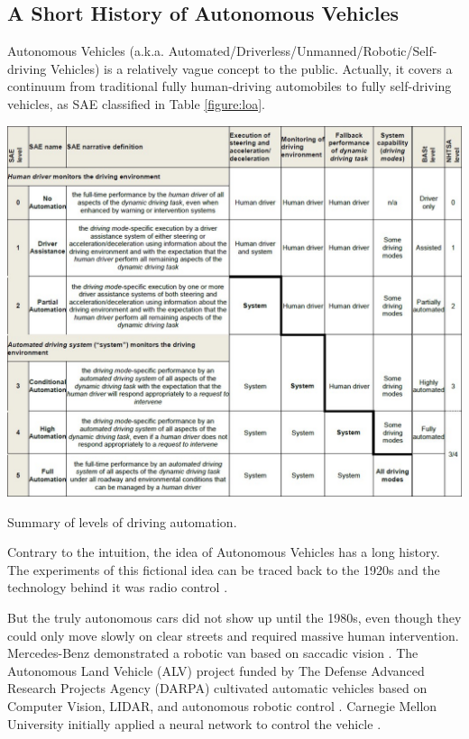 \documentclass[a4paper,12pt]{article}
\begin{document}
\subsection{A Short History of Autonomous Vehicles}
\label{avh}

Autonomous Vehicles (a.k.a. Automated/Driverless/Unmanned/Robotic/Self-driving Vehicles) is a relatively vague concept to the public. Actually, it covers a continuum  from traditional fully human-driving automobiles to fully self-driving vehicles, as SAE classified in Table \ref{figure:loa}.

\begin{table}[h]		
	\includegraphics[width=1\textwidth]{Levels_of_Automation_2014.jpg}
	\caption{Summary of levels of driving automation\cite{J3016_201401}.}
	\centering
	\label{figure:loa}
\end{table}

Contrary to the intuition, the idea of Autonomous Vehicles has a long history. The experiments of this fictional idea can be traced back to the 1920s and the technology behind it was radio control \cite{pawtc}. 

But the truly autonomous cars did not show up until the 1980s, even though they could only move slowly on clear streets and required massive human intervention. Mercedes-Benz demonstrated a robotic van based on saccadic vision \cite{schj}. The Autonomous Land Vehicle (ALV) project funded by The Defense Advanced Research Projects Agency (DARPA) cultivated automatic vehicles based on Computer Vision, LIDAR, and autonomous robotic control \cite{Kanade:1986:ALV:324634.325197}. Carnegie Mellon University initially applied a neural network to control the vehicle \cite{NIPS1988_95}. 
\end{document}
